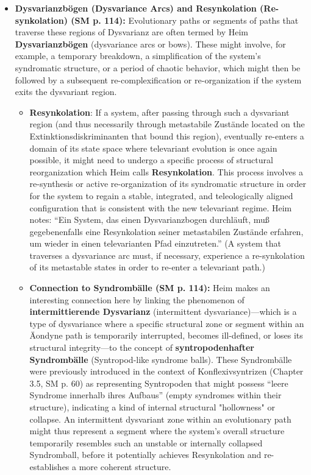 \documentclass[12pt]{article}
\newcommand{\q}[1]{\enquote{#1}}
\begin{document}
\begin{itemize}
    \item \textbf{Dysvarianzbögen (Dysvariance Arcs) and Resynkolation (Re-synkolation) (SM p. 114):}
    Evolutionary paths or segments of paths that traverse these regions of Dysvarianz are often termed by Heim \textbf{Dysvarianzbögen} (dysvariance arcs or bows). These might involve, for example, a temporary breakdown, a simplification of the system's syndromatic structure, or a period of chaotic behavior, which might then be followed by a subsequent re-complexification or re-organization if the system exits the dysvariant region.
    \begin{itemize}
        \item \textbf{Resynkolation}: If a system, after passing through such a dysvariant region (and thus necessarily through metastabile Zustände located on the Extinktionsdiskriminanten that bound this region), eventually re-enters a domain of its state space where televariant evolution is once again possible, it might need to undergo a specific process of structural reorganization which Heim calls \textbf{Resynkolation}. This process involves a re-synthesis or active re-organization of its syndromatic structure in order for the system to regain a stable, integrated, and teleologically aligned configuration that is consistent with the new televariant regime. Heim notes: \q{Ein System, das einen Dysvarianzbogen durchläuft, muß gegebenenfalls eine Resynkolation seiner metastabilen Zustände erfahren, um wieder in einen televarianten Pfad einzutreten.} (A system that traverses a dysvariance arc must, if necessary, experience a re-synkolation of its metastable states in order to re-enter a televariant path.)
        \item \textbf{Connection to Syndrombälle (SM p. 114):} Heim makes an interesting connection here by linking the phenomenon of \textbf{intermittierende Dysvarianz} (intermittent dysvariance)—which is a type of dysvariance where a specific structural zone or segment within an Äondyne path is temporarily interrupted, becomes ill-defined, or loses its structural integrity—to the concept of \textbf{syntropodenhafter Syndrombälle} (Syntropod-like syndrome balls). These Syndrombälle were previously introduced in the context of Konflexivsyntrizen (Chapter 3.5, SM p. 60) as representing Syntropoden that might possess \q{leere Syndrome innerhalb ihres Aufbaus} (empty syndromes within their structure), indicating a kind of internal structural "hollowness" or collapse. An intermittent dysvariant zone within an evolutionary path might thus represent a segment where the system's overall structure temporarily resembles such an unstable or internally collapsed Syndromball, before it potentially achieves Resynkolation and re-establishes a more coherent structure.
    \end{itemize}
\end{itemize}
\end{document}
